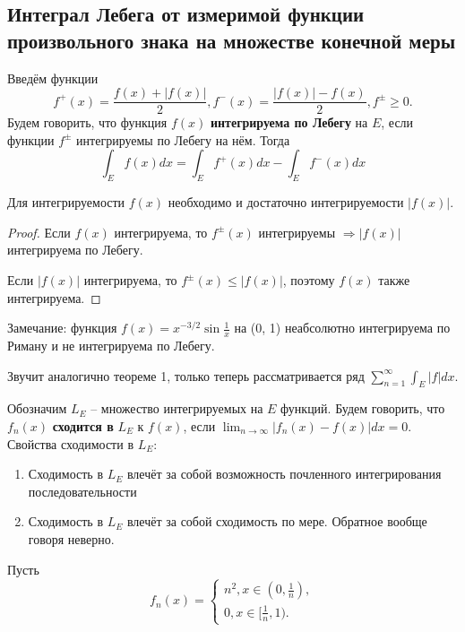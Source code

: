\documentclass[11pt]{article}
\def\zall{\setcounter{lem}{0}\setcounter{cnsqnc}{0}\setcounter{th}{0}\setcounter{Cmt}{0}\setcounter{equation}{0}\setcounter{stnmt}{0}}
\newcounter{lem}\setcounter{lem}{0}
\newcounter{stnmt}\setcounter{stnmt}{0}
\def\st{\par\smallskip\refstepcounter{stnmt}\textbf{\arabic{stnmt}}}
\newtheorem*{Statement}{Утверждение \st}
\newcounter{th}\setcounter{th}{0}
\def\th{\par\smallskip\refstepcounter{th}\textbf{\arabic{th}}}
\newtheorem*{Theorem}{Теорема \th}
\newcounter{cnsqnc}\setcounter{cnsqnc}{0}
\newcounter{Cmt}\setcounter{Cmt}{0}
\begin{document}
\subsection{Интеграл Лебега от измеримой функции произвольного знака на множестве конечной меры}
\label{sec:org3cdf4c8}
Введём функции
\zall
\begin{equation}
f^+(x) = \frac{f(x) + |f(x)|}2, f^-(x) = \frac{|f(x)| - f(x)}2, f^{\pm} \geq 0.
\end{equation}
Будем говорить, что функция \(f(x)\) \textbf{интегрируема по Лебегу} на \(E\), если функции \(f^{\pm}\)
интегрируемы по Лебегу на нём. Тогда
\begin{equation}
\int_Ef(x)dx = \int_Ef^+(x)dx - \int_Ef^-(x)dx
\end{equation}
\begin{Statement}
Для интегрируемости $f(x)$ необходимо и достаточно интегрируемости $|f(x)|$.
\end{Statement}
\begin{proof}
Если $f(x)$ интегрируема, то $f^{\pm}(x)$ интегрируемы $\Rightarrow |f(x)|$ интегрируема по
Лебегу.

Если $|f(x)|$ интегрируема, то $f^{\pm}(x) \leq |f(x)|$, поэтому $f(x)$ также интегрируема.
\end{proof}
Замечание: функция $f(x) = x^{-3/2}\sin\frac1x$ на (0, 1) неабсолютно интегрируема по Риману и
не интегрируема по Лебегу.
\begin{Theorem}
Звучит аналогично теореме 1, только теперь рассматривается ряд $\sum_{n = 1}^{\infty}\int_E|f|dx$.
\end{Theorem}
Обозначим $L_E$ -- множество интегрируемых на $E$ функций. Будем говорить, что $f_n(x)$
\textbf{сходится в} $L_E$ к $f(x)$, если $\lim_{n \to \infty}|f_n(x) - f(x)|dx = 0$.
Свойства сходимости в $L_E$:
\begin{enumerate}
\item Сходимость в $L_E$ влечёт за собой возможность почленного интегрирования последовательности
\item Сходимость в $L_E$ влечёт за собой сходимость по мере. Обратное вообще говоря неверно.
\end{enumerate}
Пусть
\begin{equation}
f_n(x) = \begin{cases}
n^2, x \in (0, \frac1n), \\
0, x \in [\frac1n, 1).
\end{cases}
\end{equation}
\end{document}
